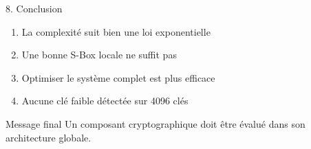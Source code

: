 \documentclass[10pt]{beamer}
\begin{document}
\begin{frame}{8. Conclusion}

\begin{enumerate}
    \item La complexité suit bien une loi exponentielle
    \item Une bonne S-Box locale ne suffit pas
    \item Optimiser le système complet est plus efficace
    \item Aucune clé faible détectée sur 4096 clés
\end{enumerate}

\vspace{0.5cm}

\begin{block}{Message final}
Un composant cryptographique doit être évalué dans son architecture globale.
\end{block}

\end{frame}

\end{document}
